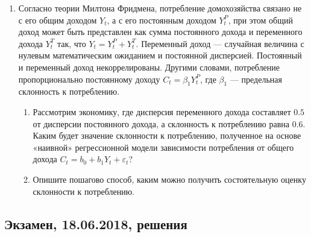 \begin{enumerate}
\item
Согласно теории Милтона Фридмена, потребление домохозяйства связано не с его общим доходом $Y_t$,
а с его постоянным доходом $Y_t^P$, при этом общий доход может быть представлен
как сумма постоянного дохода и переменного дохода $Y_t^T$ так, что $Y_t = Y_t^P + Y_t^T$.
Переменный доход — случайная величина с нулевым математическим ожиданием и постоянной дисперсией.
Постоянный и переменный доход некоррелированы. Другими словами, потребление пропорционально постоянному доходу $C_t = \beta_1 Y_t^P$,
где $\beta_1$ — предельная склонность к потреблению.

\begin{enumerate}
\item Рассмотрим экономику, где дисперсия переменного дохода составляет $0.5$ от дисперсии постоянного дохода,
а склонность к потреблению равна 0.6. Каким будет значение склонности к потреблению,
полученное на основе «наивной» регрессионной модели зависимости потребления
от общего дохода $C_t = b_0 + b_1 Y_t + \varepsilon_t$?
\item Опишите пошагово способ, каким можно получить состоятельную оценку склонности к потреблению.
\end{enumerate}


\end{enumerate}


\subsection{Экзамен, 18.06.2018, решения}

